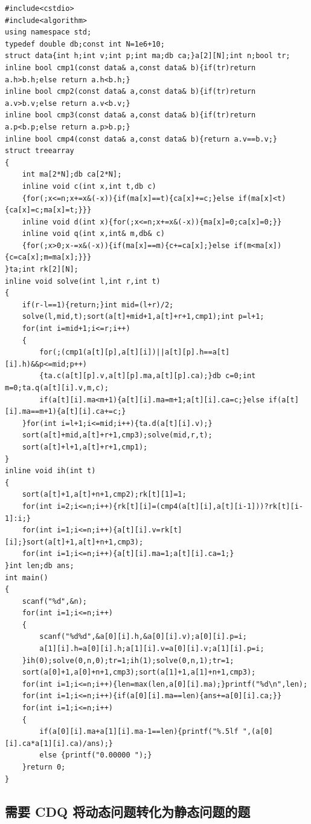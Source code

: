 \begin{verbatim}
#include<cstdio>
#include<algorithm>
using namespace std;
typedef double db;const int N=1e6+10;
struct data{int h;int v;int p;int ma;db ca;}a[2][N];int n;bool tr;
inline bool cmp1(const data& a,const data& b){if(tr)return a.h>b.h;else return a.h<b.h;}
inline bool cmp2(const data& a,const data& b){if(tr)return a.v>b.v;else return a.v<b.v;}
inline bool cmp3(const data& a,const data& b){if(tr)return a.p<b.p;else return a.p>b.p;}
inline bool cmp4(const data& a,const data& b){return a.v==b.v;}
struct treearray
{
    int ma[2*N];db ca[2*N];
    inline void c(int x,int t,db c)
    {for(;x<=n;x+=x&(-x)){if(ma[x]==t){ca[x]+=c;}else if(ma[x]<t){ca[x]=c;ma[x]=t;}}}
    inline void d(int x){for(;x<=n;x+=x&(-x)){ma[x]=0;ca[x]=0;}}
    inline void q(int x,int& m,db& c)
    {for(;x>0;x-=x&(-x)){if(ma[x]==m){c+=ca[x];}else if(m<ma[x]){c=ca[x];m=ma[x];}}}
}ta;int rk[2][N];
inline void solve(int l,int r,int t)
{
    if(r-l==1){return;}int mid=(l+r)/2;
    solve(l,mid,t);sort(a[t]+mid+1,a[t]+r+1,cmp1);int p=l+1;
    for(int i=mid+1;i<=r;i++)
    {
        for(;(cmp1(a[t][p],a[t][i])||a[t][p].h==a[t][i].h)&&p<=mid;p++)
        {ta.c(a[t][p].v,a[t][p].ma,a[t][p].ca);}db c=0;int m=0;ta.q(a[t][i].v,m,c);
        if(a[t][i].ma<m+1){a[t][i].ma=m+1;a[t][i].ca=c;}else if(a[t][i].ma==m+1){a[t][i].ca+=c;}
    }for(int i=l+1;i<=mid;i++){ta.d(a[t][i].v);}
    sort(a[t]+mid,a[t]+r+1,cmp3);solve(mid,r,t);
    sort(a[t]+l+1,a[t]+r+1,cmp1);
}
inline void ih(int t)
{
    sort(a[t]+1,a[t]+n+1,cmp2);rk[t][1]=1;
    for(int i=2;i<=n;i++){rk[t][i]=(cmp4(a[t][i],a[t][i-1]))?rk[t][i-1]:i;}
    for(int i=1;i<=n;i++){a[t][i].v=rk[t][i];}sort(a[t]+1,a[t]+n+1,cmp3);
    for(int i=1;i<=n;i++){a[t][i].ma=1;a[t][i].ca=1;}
}int len;db ans;
int main()
{
    scanf("%d",&n);
    for(int i=1;i<=n;i++)
    {
        scanf("%d%d",&a[0][i].h,&a[0][i].v);a[0][i].p=i;
        a[1][i].h=a[0][i].h;a[1][i].v=a[0][i].v;a[1][i].p=i;
    }ih(0);solve(0,n,0);tr=1;ih(1);solve(0,n,1);tr=1;
    sort(a[0]+1,a[0]+n+1,cmp3);sort(a[1]+1,a[1]+n+1,cmp3);
    for(int i=1;i<=n;i++){len=max(len,a[0][i].ma);}printf("%d\n",len);
    for(int i=1;i<=n;i++){if(a[0][i].ma==len){ans+=a[0][i].ca;}}
    for(int i=1;i<=n;i++)
    {
        if(a[0][i].ma+a[1][i].ma-1==len){printf("%.5lf ",(a[0][i].ca*a[1][i].ca)/ans);}
        else {printf("0.00000 ");}
    }return 0;
}
\end{verbatim}

\hr

\subsection{需要 CDQ 将动态问题转化为静态问题的题}

